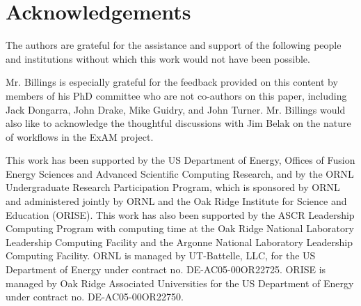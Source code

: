 \section{Acknowledgements}
The authors are grateful for the assistance and support of the following people
and institutions without which this work would not have been possible.

Mr. Billings is especially grateful for the feedback provided on this content by members of his PhD committee who are not co-authors on this paper, including Jack Dongarra, John Drake, Mike Guidry, and John Turner. Mr. Billings would also like to acknowledge the thoughtful discussions with Jim Belak on the nature of workflows in the ExAM project.

This work has been supported by the US Department of Energy, Offices of Fusion
Energy Sciences and Advanced Scientific Computing Research, and by the ORNL
Undergraduate Research Participation Program, which is sponsored by ORNL and
administered jointly by ORNL and the Oak Ridge Institute for Science and
Education (ORISE). This work has also been supported by the ASCR Leadership
Computing Program with computing time at the Oak Ridge National Laboratory
Leadership Computing Facility and the Argonne National Laboratory Leadership
Computing Facility. ORNL is managed by UT-Battelle, LLC, for the US Department
of Energy under contract no. DE-AC05-00OR22725. ORISE is managed by Oak Ridge
Associated Universities for the US Department of Energy under contract no.
DE-AC05-00OR22750.
